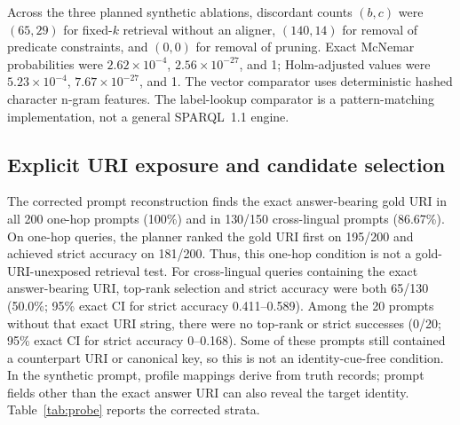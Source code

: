 \documentclass[a4paper,fleqn]{cas-dc}
\begin{document}
Across the three planned synthetic ablations, discordant counts $(b,c)$ were $(65,29)$ for fixed-$k$ retrieval without an aligner, $(140,14)$ for removal of predicate constraints, and $(0,0)$ for removal of pruning. Exact McNemar probabilities were $2.62\times10^{-4}$, $2.56\times10^{-27}$, and 1; Holm-adjusted values were $5.23\times10^{-4}$, $7.67\times10^{-27}$, and 1. The vector comparator uses deterministic hashed character n-gram features. The label-lookup comparator is a pattern-matching implementation, not a general SPARQL~1.1 engine.

\begin{table}[t]
\centering\small

\caption{Primary 500-query results. Strict accuracy is the object-grounded measure in Eq.~(\ref{eq:strict}) with exact 95\% intervals. GSR is logical triple access. The vector and label-lookup rows are implementation-specific comparators.}
\label{tab:main}
\end{table}

\begin{table}[t]
\centering\small

\caption{Descriptive strict-success rates for the full planner and fixed-$k$ no-aligner baseline by query family, calculated on the same query identifiers. No subgroup significance tests are reported.}
\label{tab:family}
\end{table}

\subsection{Explicit URI exposure and candidate selection}
The corrected prompt reconstruction finds the exact answer-bearing gold URI in all 200 one-hop prompts (100\%) and in 130/150 cross-lingual prompts (86.67\%). On one-hop queries, the planner ranked the gold URI first on 195/200 and achieved strict accuracy on 181/200. Thus, this one-hop condition is not a gold-URI-unexposed retrieval test. For cross-lingual queries containing the exact answer-bearing URI, top-rank selection and strict accuracy were both 65/130 (50.0\%; 95\% exact CI for strict accuracy 0.411--0.589). Among the 20 prompts without that exact URI string, there were no top-rank or strict successes (0/20; 95\% exact CI for strict accuracy 0--0.168). Some of these prompts still contained a counterpart URI or canonical key, so this is not an identity-cue-free condition. In the synthetic prompt, profile mappings derive from truth records; prompt fields other than the exact answer URI can also reveal the target identity. Table~\ref{tab:probe} reports the corrected strata.
\end{document}
